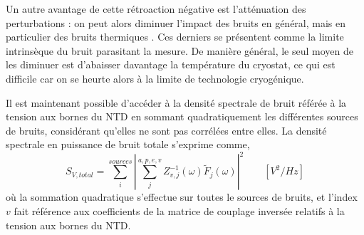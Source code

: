 Un autre avantage de cette rétroaction négative est l'atténuation des perturbations : on peut alors diminuer l'impact des bruits en général, mais en particulier des bruits thermiques \cite{mather}. Ces derniers se présentent comme la limite intrinsèque du bruit parasitant la mesure. De manière général, le seul moyen de les diminuer est d'abaisser davantage la température du cryostat, ce qui est difficile car on se heurte alors à la limite de technologie cryogénique.

Il est maintenant possible d'accéder à la densité spectrale de bruit référée à la tension aux bornes du NTD en sommant quadratiquement les différentes sources de bruits, considérant qu'elles ne sont pas corrélées entre elles. La densité spectrale en puissance de bruit totale s'exprime comme,
\begin{equation}
\label{psd-total}
S_{V,total} = \sum_i^{sources} \left\vert \sum_j^{a,p,e,v} Z_{v,j}^{-1} (\omega) \tilde{F}_j(\omega) \right\vert^2 \qquad [V^2/Hz]
\end{equation}
où la sommation quadratique s'effectue sur toutes le sources de bruits, et l'index $v$ fait référence aux coefficients de la matrice de couplage inversée relatifs à la tension aux bornes du NTD.

